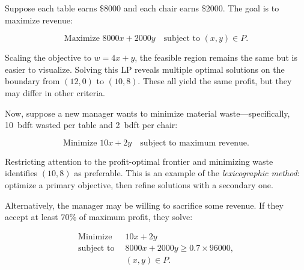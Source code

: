 Suppose each table earns \$8000 and each chair earns \$2000. The goal is to maximize revenue:

\[
\text{Maximize } 8000x + 2000y \quad \text{subject to } (x, y) \in P.
\]

Scaling the objective to \(w = 4x + y\), the feasible region remains the same but is easier to visualize. Solving this LP reveals multiple optimal solutions on the boundary from \((12, 0)\) to \((10, 8)\). These all yield the same profit, but they may differ in other criteria.

Now, suppose a new manager wants to minimize material waste—specifically, 10~bdft wasted per table and 2~bdft per chair:

\[
\text{Minimize } 10x + 2y \quad \text{subject to maximum revenue}.
\]

Restricting attention to the profit-optimal frontier and minimizing waste identifies \((10, 8)\) as preferable. This is an example of the \emph{lexicographic method}: optimize a primary objective, then refine solutions with a secondary one.

Alternatively, the manager may be willing to sacrifice some revenue. If they accept at least 70\% of maximum profit, they solve:

\[
\begin{aligned}
\text{Minimize } &\, 10x + 2y \\
\text{subject to } &\, 8000x + 2000y \ge 0.7 \times 96000,\\
&\, (x, y) \in P.
\end{aligned}
\]

